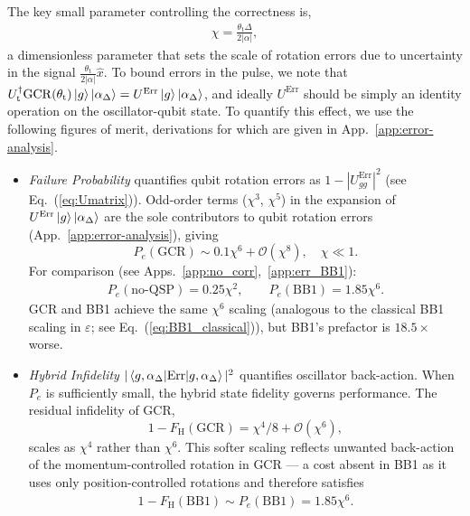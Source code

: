 \documentclass[aps,prx,showpacs,notitlepage,twocolumn,superscriptaddress,nofootinbib,preprintnumbers,floatfix,10pt, longbibliography]{revtex4-2}
\begin{document}
The key small parameter controlling the correctness is,
\begin{align}
  \chi = \frac{\theta_\mathrm{t}\Delta}{2|\alpha|},\label{eq:chi}
\end{align}
a dimensionless parameter that sets the scale of rotation errors due to uncertainty in the signal $\frac{\theta_\mathrm{t}}{2|\alpha|}\hat x$. To bound errors in the pulse, we note that $U_\mathrm{t}^\dagger \mathrm{GCR}(\theta_\mathrm{t})\ket{g}\ket{\alpha_\Delta} = U^\mathrm{Err}\ket{g}\ket{\alpha_\Delta}$, and ideally $U^\mathrm{Err}$ should be simply an identity operation on the oscillator-qubit state.  To quantify this effect, we use the following figures of merit, derivations for which are given in App.~\ref{app:error-analysis}.
\begin{itemize}
    \item \textit{Failure Probability} quantifies qubit rotation errors as $1-|U_{gg}^\mathrm{Err}|^2$ (see Eq.~(\ref{eq:Umatrix})). Odd-order terms ($\chi^3$, $\chi^5$) in the expansion of $U^{\mathrm{Err}}\ket{g}\ket{\alpha_\Delta}$ are the sole contributors to qubit rotation errors (App.~\ref{app:error-analysis}), giving 
\begin{equation}
P_e(\mathrm{GCR})\sim 0.1\chi^6+\mathcal{O}(\chi^{8}),
\quad \chi\ll 1.\label{eq:fail_gcr}
\end{equation}
For comparison (see Apps.~\ref{app:no_corr},~\ref{app:err_BB1}):
\begin{align}
P_e(\mathrm{no\text{-}QSP}) = 0.25\chi^2,
\qquad
P_e(\mathrm{BB1}) = 1.85\chi^6.
\end{align}
GCR and BB1 achieve the same $\chi^6$ scaling (analogous to the classical BB1 scaling in $\varepsilon$; see Eq.~(\ref{eq:BB1_classical})), but BB1's prefactor is $18.5\times$ worse.
\item\textit{Hybrid Infidelity} $|\braket{g,\alpha_\Delta|\mathrm{Err}|g,\alpha_\Delta}|^2$ quantifies oscillator back-action. When $P_e$ is sufficiently small, the hybrid state fidelity governs performance. The residual infidelity of GCR,
\begin{equation}
1-F_\mathrm{H}(\mathrm{GCR})=\chi^4/8+\mathcal{O}(\chi^6),
\label{eq:reset_fid_gcr}
\end{equation}
scales as $\chi^4$ rather than $\chi^6$. This softer scaling reflects unwanted back-action of the momentum-controlled rotation in GCR --- a cost absent in BB1 as it uses only position-controlled rotations and therefore satisfies 
\begin{align}
    1-F_\mathrm{H}(\mathrm{BB1})\sim P_e(\mathrm{BB1})=1.85\chi^6.

\end{align}
\end{itemize}
\end{document}
